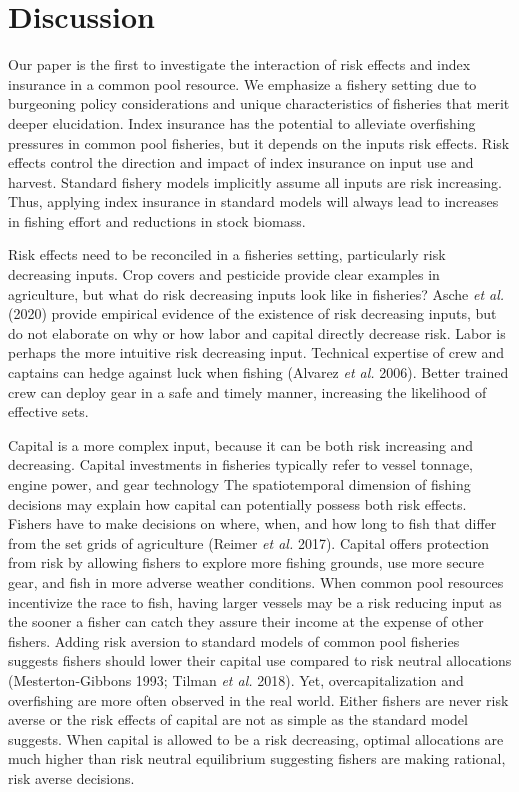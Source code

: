 \documentclass[
  letterpaper,
  DIV=11,
  numbers=noendperiod]{scrartcl}
\theoremstyle{plain}
\theoremstyle{plain}
\theoremstyle{remark}
\begin{document}
\hypertarget{sec-disc}{%
\section{Discussion}\label{sec-disc}}

Our paper is the first to investigate the interaction of risk effects
and index insurance in a common pool resource. We emphasize a fishery
setting due to burgeoning policy considerations and unique
characteristics of fisheries that merit deeper elucidation. Index
insurance has the potential to alleviate overfishing pressures in common
pool fisheries, but it depends on the inputs risk effects. Risk effects
control the direction and impact of index insurance on input use and
harvest. Standard fishery models implicitly assume all inputs are risk
increasing. Thus, applying index insurance in standard models will
always lead to increases in fishing effort and reductions in stock
biomass.

Risk effects need to be reconciled in a fisheries setting, particularly
risk decreasing inputs. Crop covers and pesticide provide clear examples
in agriculture, but what do risk decreasing inputs look like in
fisheries? Asche \emph{et al.} (2020) provide empirical evidence of the
existence of risk decreasing inputs, but do not elaborate on why or how
labor and capital directly decrease risk. Labor is perhaps the more
intuitive risk decreasing input. Technical expertise of crew and
captains can hedge against luck when fishing (Alvarez \emph{et al.}
2006). Better trained crew can deploy gear in a safe and timely manner,
increasing the likelihood of effective sets.

Capital is a more complex input, because it can be both risk increasing
and decreasing. Capital investments in fisheries typically refer to
vessel tonnage, engine power, and gear technology The spatiotemporal
dimension of fishing decisions may explain how capital can potentially
possess both risk effects. Fishers have to make decisions on where,
when, and how long to fish that differ from the set grids of agriculture
(Reimer \emph{et al.} 2017). Capital offers protection from risk by
allowing fishers to explore more fishing grounds, use more secure gear,
and fish in more adverse weather conditions. When common pool resources
incentivize the race to fish, having larger vessels may be a risk
reducing input as the sooner a fisher can catch they assure their income
at the expense of other fishers. Adding risk aversion to standard models
of common pool fisheries suggests fishers should lower their capital use
compared to risk neutral allocations (Mesterton-Gibbons 1993; Tilman
\emph{et al.} 2018). Yet, overcapitalization and overfishing are more
often observed in the real world. Either fishers are never risk averse
or the risk effects of capital are not as simple as the standard model
suggests. When capital is allowed to be a risk decreasing, optimal
allocations are much higher than risk neutral equilibrium suggesting
fishers are making rational, risk averse decisions.
\end{document}

